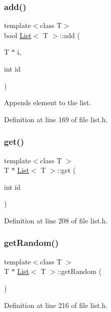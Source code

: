 \subsubsection{\texorpdfstring{add()}{add()}}
{\footnotesize\ttfamily template$<$class T$>$ \\
bool \hyperlink{classList}{List}$<$ T $>$\+::add (\begin{DoxyParamCaption}\item[{T $\ast$}]{i,  }\item[{int}]{id }\end{DoxyParamCaption})}

Appends element to the list. 

Definition at line 169 of file list.\+h.

\mbox{\label{classList_a29a22f2d421aaec329a0b0f78b82f648}} 
\subsubsection{\texorpdfstring{get()}{get()}}
{\footnotesize\ttfamily template$<$class T $>$ \\
T $\ast$ \hyperlink{classList}{List}$<$ T $>$\+::get (\begin{DoxyParamCaption}\item[{int}]{id }\end{DoxyParamCaption})}



Definition at line 208 of file list.\+h.

\mbox{\label{classList_a8d40594769bf8f9217e24fd1397592a6}} 
\subsubsection{\texorpdfstring{get\+Random()}{getRandom()}}
{\footnotesize\ttfamily template$<$class T $>$ \\
T $\ast$ \hyperlink{classList}{List}$<$ T $>$\+::get\+Random (\begin{DoxyParamCaption}{ }\end{DoxyParamCaption})}



Definition at line 216 of file list.\+h.

\mbox{\label{classList_a73f8b1d313382daffeeeed552f42da2f}} 
